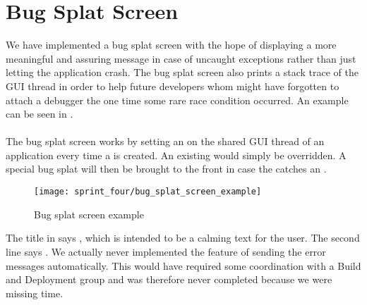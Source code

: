 
\section{Bug Splat Screen}
\label{sec:bug_splat_screen}

We have implemented a bug splat screen with the hope of displaying a more meaningful and assuring message in case of uncaught exceptions rather than just letting the application crash. The bug splat screen also prints a stack trace of the GUI thread in order to help future developers whom might have forgotten to attach a debugger the one time some rare race condition occurred. An example can be seen in .
\\\\
The bug splat screen works by setting an  on the shared GUI thread of an application every time a  is created. An existing  would simply be overridden. A special bug splat  will then be brought to the front in case the  catches an .

\begin{figure}[!htbp]
        \centering
        \texttt{[image: sprint\_four/bug\_splat\_screen\_example]}
        \caption{Bug splat screen example}
        \label{fig:bug_splat_screen_example}
\end{figure}
  
The title in  says , which is intended to be a calming text for the user. The second line says . We actually never implemented the feature of sending the error messages automatically. This would have required some coordination with a Build and Deployment group and was therefore never completed because we were missing time.   

